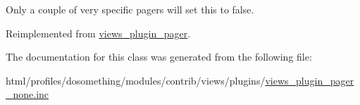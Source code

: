 Only a couple of very specific pagers will set this to false. 

Reimplemented from \hyperlink{classviews__plugin__pager_a0b77996aaa7a7b23effc4d3a6e055659}{views\_\-plugin\_\-pager}.

The documentation for this class was generated from the following file:\begin{DoxyCompactItemize}
\item 
html/profiles/dosomething/modules/contrib/views/plugins/\hyperlink{views__plugin__pager__none_8inc}{views\_\-plugin\_\-pager\_\-none.inc}\end{DoxyCompactItemize}
